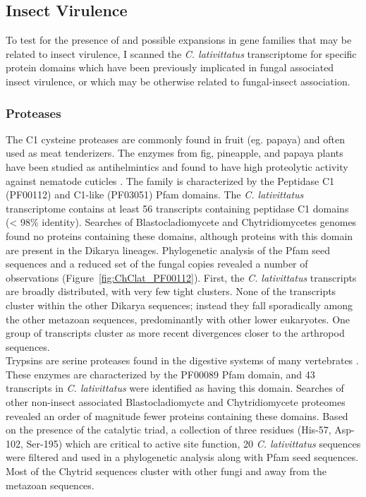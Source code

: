 \subsection*{Insect Virulence}
\indent To test for the presence of and possible expansions in gene families that may be related to insect virulence, I scanned the \textit{C. lativittatus} transcriptome for specific protein domains which have been previously implicated in fungal associated insect virulence, or which may be otherwise related to fungal-insect association. \\
\subsubsection*{Proteases}
The C1 cysteine proteases are commonly found in fruit (eg. papaya) and often used as meat tenderizers. The enzymes from fig, pineapple, and papaya plants have been studied as antihelmintics and found to have high proteolytic activity against nematode cuticles \cite{Stepek2004}. The family is characterized by the Peptidase C1 (PF00112) and C1-like (PF03051) Pfam domains. The \textit{C. lativittatus} transcriptome contains at least 56 transcripts containing peptidase C1 domains (< 98\% identity). Searches of Blastocladiomycete and Chytridiomycetes genomes found no proteins containing these domains, although proteins with this domain are present in the Dikarya lineages. Phylogenetic analysis of the Pfam seed sequences and a reduced set of the fungal copies revealed a number of observations (Figure~\ref{fig:ChClat_PF00112}). First, the \textit{C. lativittatus} transcripts are broadly distributed, with very few tight clusters. None of the transcripts cluster within the other Dikarya sequences; instead they fall sporadically among the other metazoan sequences, predominantly with other lower eukaryotes. One group of transcripts cluster as more recent divergences closer to the arthropod sequences. \\
\indent Trypsins are serine proteases found in the digestive systems of many vertebrates \cite{Rawlings1994}. These enzymes are characterized by the PF00089 Pfam domain, and 43 transcripts in \textit{C. lativittatus} were identified as having this domain. Searches of other non-insect associated Blastocladiomycte and Chytridiomycete proteomes revealed an order of magnitude fewer proteins containing these domains. Based on the presence of the catalytic triad, a collection of three residues (His-57, Asp-102, Ser-195) which are critical to active site function, 20 \textit{C. lativittatus} sequences were filtered and used in a phylogenetic analysis along with Pfam seed sequences. Most of the Chytrid sequences cluster with other fungi and away from the metazoan sequences.\\
